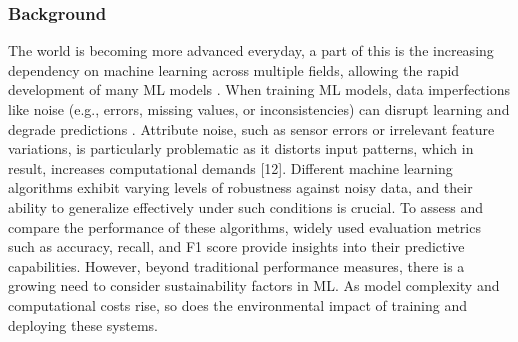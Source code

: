 \documentclass[conference]{IEEEtran}
\begin{document}
\subsubsection*{Background} The world is becoming more advanced everyday, a part of this is the increasing dependency on machine learning across multiple fields, allowing the rapid development of many ML models \cite{bain_ai_sustainability}. When training ML models, data imperfections like noise (e.g., errors, missing values, or inconsistencies) can disrupt learning and degrade predictions \cite{sciencedirect_noise}. Attribute noise, such as sensor errors or irrelevant feature variations, is particularly problematic as it distorts input patterns, which in result, increases computational demands [12]. Different machine learning algorithms exhibit varying levels of robustness against noisy data, and their ability to generalize effectively under such conditions is crucial. To assess and compare the performance of these algorithms, widely used evaluation metrics such as accuracy, recall, and F1 score provide insights into their predictive capabilities. However, beyond traditional performance measures, there is a growing need to consider sustainability factors in ML. As model complexity and computational costs rise, so does the environmental impact of training and deploying these systems. 
\newline
\newline
\end{document}
